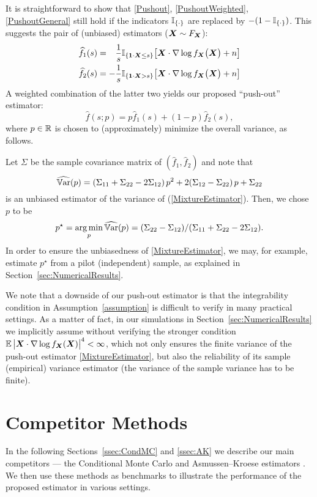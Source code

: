 It is straightforward to show that \eqref{Pushout}, \eqref{PushoutWeighted}, \eqref{PushoutGeneral} still hold if the indicators $\mathbb{I}_{\{\cdot \}}$ are replaced by $-(1-\mathbb{I}_{\{\cdot \}})$. This  suggests the pair of  (unbiased)  estimators ($\boldsymbol{X} \sim F_{\boldsymbol{X}}$):
\[
\begin{split}
\widehat{f}_{1}(s)& = \hphantom{-} \frac{1}{s} \mathbb{I}_{\{\boldsymbol{1} \cdot \boldsymbol{X} \le s \}} \big[ \boldsymbol{X} \cdot \nabla \log f_{\boldsymbol{X}}\big(\boldsymbol{X}\big) + n \big] \\
\widehat{f}_{2}(s)& = -\frac{1}{s} \mathbb{I}_{\{\boldsymbol{1} \cdot \boldsymbol{X} > s \}} \big[ \boldsymbol{X} \cdot \nabla \log f_{\boldsymbol{X}}\big(\boldsymbol{X}\big) + n \big] 
\end{split}
\]
A weighted combination of  the latter two yields our  proposed ``push-out'' estimator:
\begin{equation} \label{MixtureEstimator}
\widehat{f}(s ; p) = p \widehat{f}_{1}(s) + (1-p) \widehat{f}_{2}(s),
\end{equation}
where $p \in \mathbb{R}$ is chosen to (approximately) minimize the overall variance, as follows.

Let $\Sigma$ be the sample covariance matrix of $(\widehat{f}_1,\widehat{f}_2)$ and note that 
\[
\widehat{\operatorname{\mathbb{V}\mathrm{ar}}}(p)= (\Sigma_{11} + \Sigma_{22} - 2 \Sigma_{12}) \, p^2 + 2(\Sigma_{12} - \Sigma_{22})\, p + \Sigma_{22}
\]
is an unbiased estimator of the variance of (\ref{MixtureEstimator}). Then, we chose $p$ to be 
\begin{equation} \label{MixtureCoefficient}
p^\star = \operatorname*{arg\,min}_p \widehat{\operatorname{\mathbb{V}\mathrm{ar}}}(p) = (\Sigma_{22} - \Sigma_{12})/(\Sigma_{11} + \Sigma_{22} - 2 \Sigma_{12}).
\end{equation}
In order to ensure the unbiasedness of \eqref{MixtureEstimator}, we may, for example, estimate  $p^\star$   from a pilot (independent) sample, as explained in Section~\ref{sec:NumericalResults}. 

We note that a downside of our push-out estimator is that the integrability condition in Assumption~\ref{assumption} is difficult to verify in many practical settings. As a matter of fact, in our simulations in Section~\ref{sec:NumericalResults} we implicitly assume without verifying the  stronger condition  $\mathbb{E}\left|\boldsymbol{X} \cdot \nabla \log f_{\boldsymbol{X}}(\boldsymbol{X})\right|^4<\infty$, which not only ensures the finite variance of the push-out estimator \eqref{MixtureEstimator}, but also the reliability of its sample (empirical) variance estimator (the variance of the sample variance has to be finite).

\section{Competitor Methods} 
In the following Sections~\ref{ssec:CondMC} and \ref{ssec:AK} we describe our main competitors --- the Conditional Monte Carlo  and Asmussen--Kroese estimators \cite{asmussen2017conditional}. We then use these methods as benchmarks to illustrate the performance of the proposed estimator in various settings. 

